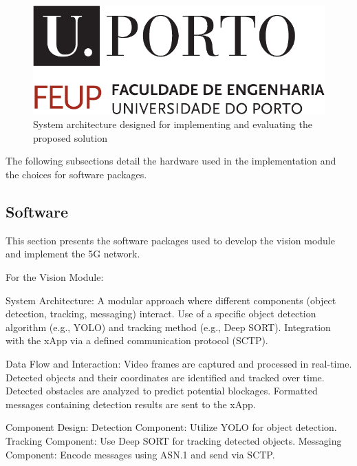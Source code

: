\begin{figure}
    \centering
    \includegraphics{figures/uporto-feup}
    \caption[System architecture designed for implementing and evaluating the proposed solution]{System architecture designed for implementing and evaluating the proposed solution}
    \label{fig:design_arch}
\end{figure}

The following subsections detail the hardware used in the implementation and the choices for software packages.


\subsection{Software}
This section presents the software packages used to develop the vision module and implement the 5G network.

For the Vision Module:

    System Architecture:
        A modular approach where different components (object detection, tracking, messaging) interact.
        Use of a specific object detection algorithm (e.g., YOLO) and tracking method (e.g., Deep SORT).
        Integration with the xApp via a defined communication protocol (SCTP).

    Data Flow and Interaction:
        Video frames are captured and processed in real-time.
        Detected objects and their coordinates are identified and tracked over time.
        Detected obstacles are analyzed to predict potential blockages.
        Formatted messages containing detection results are sent to the xApp.

    Component Design:
        Detection Component: Utilize YOLO for object detection.
        Tracking Component: Use Deep SORT for tracking detected objects.
        Messaging Component: Encode messages using ASN.1 and send via SCTP.



